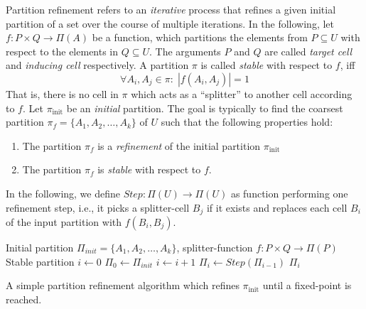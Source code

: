 		Partition refinement refers to an \textit{iterative} process that refines a given initial partition of a set over the course of multiple iterations.
		In the following, let $f: P \times Q \rightarrow \Pi(A)$ be a function, which partitions the elements from $P \subseteq U$ with respect to the elements in $Q \subseteq U$. The arguments $P$ and $Q$ are called \textit{target cell} and \textit{inducing cell} respectively.
		A partition $\pi$ is called \textit{stable} with respect to $f$, iff
		\begin{equation*}
			\forall A_i, A_j \in \pi: \; |f(A_i, A_j)| = 1
		\end{equation*}
		That is, there is no cell in $\pi$ which acts as a \enquote{splitter} to another cell according to $f$.
		Let $\pi_{\mathrm{init}}$ be an \textit{initial} partition. The goal is typically to find the coarsest partition $\pi_f = \{ A_1, A_2, \ldots, A_k \}$ of $U$ such that the following properties hold:
		
		\begin{enumerate}
			\item The partition $\pi_f$ is a \textit{refinement} of the initial partition $\pi_{\mathrm{init}}$
			\item The partition $\pi_f$ is \textit{stable} with respect to $f$.
		\end{enumerate}
		
		In the following, we define $Step: \Pi(U) \rightarrow \Pi(U)$ as function performing one refinement step, i.e., it picks a splitter-cell $B_j$ if it exists and replaces each cell $B_i$ of the input partition with $f(B_i, B_j)$.

		\begin{algorithm}[ht!]
			\centering
			\begin{algorithmic}
				\Require Initial partition $\Pi_{init} = \{ A_1, A_2, \ldots, A_k \}$, splitter-function $f: P \times Q \rightarrow \Pi(P)$
				\Ensure Stable partition
				\Statex
					\State $i \gets 0$
					\State $\Pi_0 \gets \Pi_{init}$
					\Repeat
						\State $i \gets i + 1$
						\State $\Pi_i \gets Step(\Pi_{i-1})$
					\State \Return $\Pi_i$
				\EndFunction
			\end{algorithmic}
			\caption{A simple partition refinement algorithm which refines $\pi_{\mathrm{init}}$ until a fixed-point is reached.}
			\label{algo:prelims:refinement}
		\end{algorithm}
		
